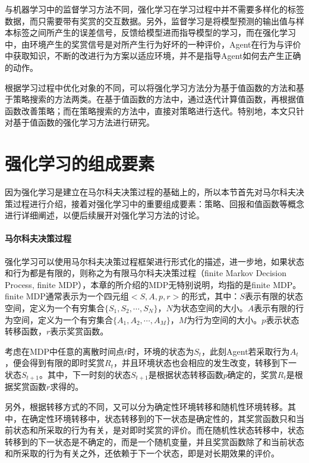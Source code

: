  与机器学习中的监督学习方法不同，强化学习在学习过程中并不需要多样化的标签数据，而只需要带有奖赏的交互数据。另外，监督学习是将模型预测的输出值与样本标签之间所产生的误差信号，反馈给模型进而指导模型的学习，而在强化学习中，由环境产生的奖赏信号是对所产生行为好坏的一种评价，Agent在行为与评价中获取知识，不断的改进行为方案以适应环境，并不是指导Agent如何去产生正确的动作。

 根据学习过程中优化对象的不同，可以将强化学习方法分为基于值函数的方法和基于策略搜索的方法两类。在基于值函数的方法中，通过迭代计算值函数，再根据值函数改善策略；而在策略搜索的方法中，直接对策略进行迭代。特别地，本文只针对基于值函数的强化学习方法进行研究。

\section{强化学习的组成要素}
因为强化学习是建立在马尔科夫决策过程的基础上的，所以本节首先对马尔科夫决策过程进行介绍，接着对强化学习中的重要组成要素：策略、回报和值函数等概念进行详细阐述，以便后续展开对强化学习方法的讨论。

\paragraph{马尔科夫决策过程}
强化学习可以使用马尔科夫决策过程框架进行形式化的描述，进一步地，如果状态和行为都是有限的，则称之为有限马尔科夫决策过程（finite Markov Decision Process, finite MDP），本章的所介绍的MDP无特别说明，均指的是finite MDP。finite MDP通常表示为一个四元组$<S,A,p,r>$的形式，其中：$S$表示有限的状态空间，定义为一个有穷集合$\{ S_1,S_2,\cdots ,S_N \}$，$N$为状态空间的大小。$A$表示有限的行为空间，定义为一个有穷集合$\{ A_1,A_2,\cdots ,A_M \}$，$M$为行为空间的大小。$p$表示状态转移函数，$r$表示奖赏函数。

考虑在MDP中任意的离散时间点$t$时，环境的状态为$S_{t}$，此刻Agent若采取行为$A_{t}$，便会得到有限的即时奖赏$R_{t}$，并且环境状态也会相应的发生改变，转移到下一状态$S_{t+1}$。其中，下一时刻的状态$S_{t+1}$是根据状态转移函数$p$确定的，奖赏$R_{t}$是根据奖赏函数$r$求得的。

另外，根据转移方式的不同，又可以分为确定性环境转移和随机性环境转移。其中，在确定性环境转移中，状态转移到的下一状态是确定性的，其奖赏函数只和当前状态和所采取的行为有关，是对即时奖赏的评价。而在随机性状态转移中，状态转移到的下一状态是不确定的，而是一个随机变量，并且奖赏函数除了和当前状态和所采取的行为有关之外，还依赖于下一个状态，即是对长期效果的评价。

